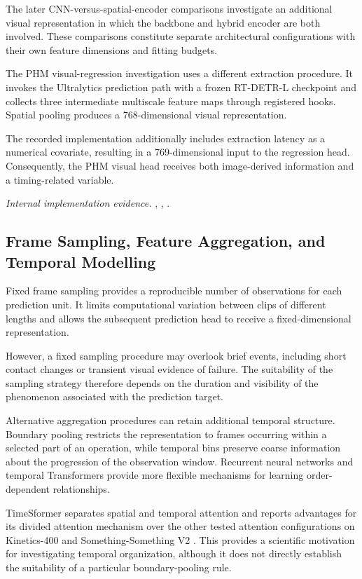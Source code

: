 The later CNN-versus-spatial-encoder comparisons investigate an additional visual representation in which the backbone and hybrid encoder are both involved. These comparisons constitute separate architectural configurations with their own feature dimensions and fitting budgets.

The PHM visual-regression investigation uses a different extraction procedure. It invokes the Ultralytics prediction path with a frozen RT-DETR-L checkpoint and collects three intermediate multiscale feature maps through registered hooks. Spatial pooling produces a 768-dimensional visual representation.

The recorded implementation additionally includes extraction latency as a numerical covariate, resulting in a 769-dimensional input to the regression head. Consequently, the PHM visual head receives both image-derived information and a timing-related variable.

\noindent\textit{Internal implementation evidence.} , , .

\subsection{Frame Sampling, Feature Aggregation, and Temporal Modelling}

Fixed frame sampling provides a reproducible number of observations for each prediction unit. It limits computational variation between clips of different lengths and allows the subsequent prediction head to receive a fixed-dimensional representation.

However, a fixed sampling procedure may overlook brief events, including short contact changes or transient visual evidence of failure. The suitability of the sampling strategy therefore depends on the duration and visibility of the phenomenon associated with the prediction target.

Alternative aggregation procedures can retain additional temporal structure. Boundary pooling restricts the representation to frames occurring within a selected part of an operation, while temporal bins preserve coarse information about the progression of the observation window. Recurrent neural networks and temporal Transformers provide more flexible mechanisms for learning order-dependent relationships.

TimeSformer separates spatial and temporal attention and reports advantages for its divided attention mechanism over the other tested attention configurations on Kinetics-400 and Something-Something V2 \parencite[Table~1]{P034}. This provides a scientific motivation for investigating temporal organization, although it does not directly establish the suitability of a particular boundary-pooling rule.

